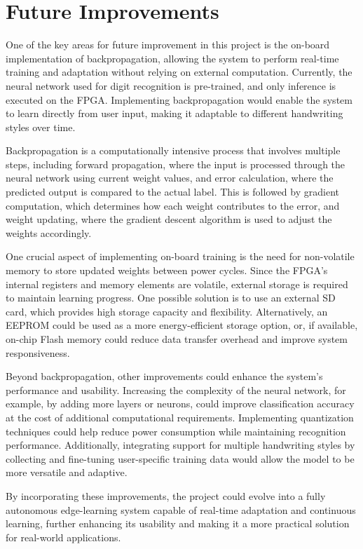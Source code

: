\documentclass[11pt]{report}
\begin{document}
\chapter{Future Improvements}

One of the key areas for future improvement in this project is the on-board implementation of backpropagation, allowing the system to perform real-time training and adaptation without relying on external computation. Currently, the neural network used for digit recognition is pre-trained, and only inference is executed on the FPGA. Implementing backpropagation would enable the system to learn directly from user input, making it adaptable to different handwriting styles over time.  

Backpropagation is a computationally intensive process that involves multiple steps, including forward propagation, where the input is processed through the neural network using current weight values, and error calculation, where the predicted output is compared to the actual label. This is followed by gradient computation, which determines how each weight contributes to the error, and weight updating, where the gradient descent algorithm is used to adjust the weights accordingly.  

One crucial aspect of implementing on-board training is the need for non-volatile memory to store updated weights between power cycles. Since the FPGA’s internal registers and memory elements are volatile, external storage is required to maintain learning progress. One possible solution is to use an external SD card, which provides high storage capacity and flexibility. Alternatively, an EEPROM could be used as a more energy-efficient storage option, or, if available, on-chip Flash memory could reduce data transfer overhead and improve system responsiveness.  

Beyond backpropagation, other improvements could enhance the system’s performance and usability. Increasing the complexity of the neural network, for example, by adding more layers or neurons, could improve classification accuracy at the cost of additional computational requirements. Implementing quantization techniques could help reduce power consumption while maintaining recognition performance. Additionally, integrating support for multiple handwriting styles by collecting and fine-tuning user-specific training data would allow the model to be more versatile and adaptive.  

By incorporating these improvements, the project could evolve into a fully autonomous edge-learning system capable of real-time adaptation and continuous learning, further enhancing its usability and making it a more practical solution for real-world applications.  
\end{document}

